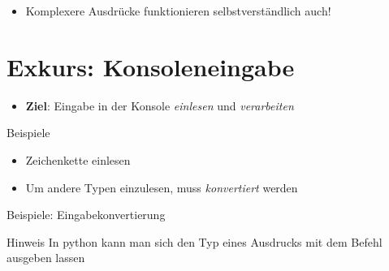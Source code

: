 \begin{frame}
    \slidehead

    \begin{itemize}[<+->]
        \item Komplexere Ausdrücke funktionieren selbstverständlich auch!
    \end{itemize}
\end{frame}

\section{Exkurs: Konsoleneingabe}
\begin{frame}
    \slidehead

    \begin{itemize}
        \item \textbf{Ziel}: Eingabe in der Konsole \textit{einlesen} und \textit{verarbeiten}
    \end{itemize}

    \begin{block}{Beispiele}
        \begin{itemize}
            \item Zeichenkette einlesen
            \item Um andere Typen einzulesen, muss \textit{konvertiert} werden
        \end{itemize}
    \end{block}
\end{frame}

\begin{frame}
    \slidehead

    Beispiele: Eingabekonvertierung

    \begin{block}{Hinweis}
        In python kann man sich den Typ eines Ausdrucks mit dem Befehl  ausgeben lassen
    \end{block}
\end{frame}

\livecoding


